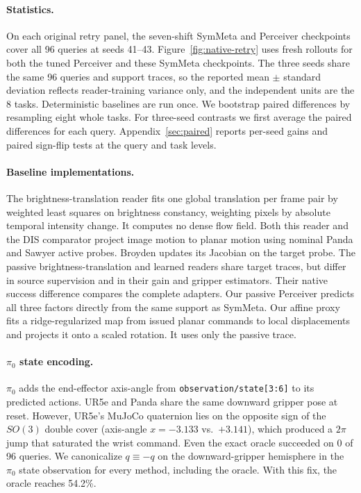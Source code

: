 \documentclass{article}
\theoremstyle{plain}
\theoremstyle{remark}
\begin{document}
\paragraph{Statistics.} On each original retry panel, the seven-shift SymMeta and Perceiver checkpoints cover all 96 queries at seeds 41--43. Figure~\ref{fig:native-retry} uses fresh rollouts for both the tuned Perceiver and these SymMeta checkpoints. The three seeds share the same 96 queries and support traces, so the reported mean $\pm$ standard deviation reflects reader-training variance only, and the independent units are the 8 tasks. Deterministic baselines are run once. We bootstrap paired differences by resampling eight whole tasks. For three-seed contrasts we first average the paired differences for each query. Appendix~\ref{sec:paired} reports per-seed gains and paired sign-flip tests at the query and task levels.

\paragraph{Baseline implementations.} The brightness-translation reader fits one global translation per frame pair by weighted least squares on brightness constancy, weighting pixels by absolute temporal intensity change. It computes no dense flow field. Both this reader and the DIS comparator project image motion to planar motion using nominal Panda and Sawyer active probes. Broyden updates its Jacobian on the target probe. The passive brightness-translation and learned readers share target traces, but differ in source supervision and in their gain and gripper estimators. Their native success difference compares the complete adapters. Our passive Perceiver predicts all three factors directly from the same support as SymMeta. Our affine proxy fits a ridge-regularized map from issued planar commands to local displacements and projects it onto a scaled rotation. It uses only the passive trace.

\paragraph{$\pi_0$ state encoding.} $\pi_0$ adds the end-effector axis-angle from \texttt{observation/state[3:6]} to its predicted actions. UR5e and Panda share the same downward gripper pose at reset. However, UR5e's MuJoCo quaternion lies on the opposite sign of the $SO(3)$ double cover (axis-angle $x = -3.133$ vs.\ $+3.141$), which produced a $2\pi$ jump that saturated the wrist command. Even the exact oracle succeeded on 0 of 96 queries. We canonicalize $q \equiv -q$ on the downward-gripper hemisphere in the $\pi_0$ state observation for every method, including the oracle. With this fix, the oracle reaches 54.2\%.
\end{document}
